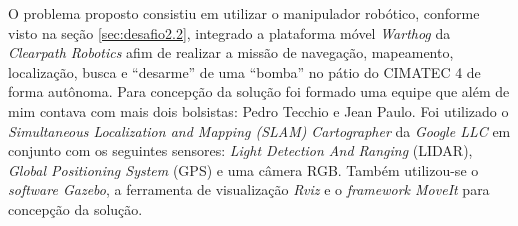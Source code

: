 O problema proposto consistiu em utilizar o manipulador robótico, conforme visto na seção \ref{sec:desafio2.2}, integrado a plataforma móvel \textit{Warthog} da \textit{Clearpath Robotics} afim de realizar a missão de navegação, mapeamento, localização, busca e ``desarme'' de uma ``bomba'' no pátio do CIMATEC 4 de forma autônoma. Para concepção da solução foi formado uma equipe que além de mim contava com mais dois bolsistas: Pedro Tecchio e Jean Paulo. Foi utilizado o \textit{Simultaneous Localization and Mapping (SLAM)} \textit{Cartographer} da \textit{Google LLC} em conjunto com os seguintes sensores: \textit{Light Detection And Ranging} (LIDAR), \textit{Global Positioning System} (GPS) e uma câmera RGB. Também utilizou-se o \textit{software Gazebo}, a ferramenta de visualização \textit{Rviz} e o \textit{framework MoveIt} para concepção da solução.

